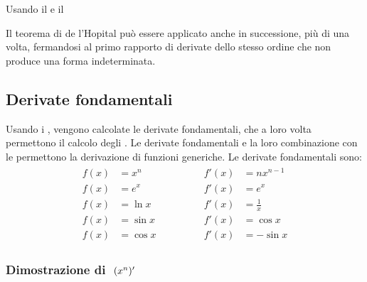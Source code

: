 \documentclass[letterpaper,10pt,italian]{jupyterBook}
\begin{document}
\sphinxAtStartPar
{} Usando il {\hyperref[\detokenize{ch/infinitesimal_calculus/derivatives:infinitesimal-calculus-derivatives-thm-cauchy}]{}} e il {\hyperref[\detokenize{ch/infinitesimal_calculus/derivatives:infinitesimal-calculus-derivatives-thm-lagrange}]{}} 

\sphinxAtStartPar
{} Il teorema di de l’Hopital può essere applicato anche in successione, più di una volta, fermandosi al primo rapporto di derivate dello stesso ordine che non produce una forma indeterminata.


\subsection{Derivate fondamentali}
\label{\detokenize{ch/infinitesimal_calculus/derivatives:derivate-fondamentali}}\label{\detokenize{ch/infinitesimal_calculus/derivatives:infinitesimal-calculus-derivatives-fund}}
\sphinxAtStartPar
Usando i {\hyperref[\detokenize{ch/infinitesimal_calculus/analysis:infinitesimal-calculus-limits-fund}]{}}, vengono calcolate le derivate fondamentali, che a loro volta permettono il calcolo degli {\hyperref[\detokenize{ch/infinitesimal_calculus/integrals:infinitesimal-calculus-integrals-fund}]{}}. Le derivate fondamentali e la loro combinazione con le {\hyperref[\detokenize{ch/infinitesimal_calculus/derivatives:infinitesimal-calculus-derivatives-rules}]{}} permettono la derivazione di funzioni generiche. Le derivate fondamentali sono:
\begin{equation}\label{equation:ch/infinitesimal_calculus/derivatives:eq:infinitesimal-calculus:derivatives:fund}
\begin{split}\begin{aligned}
f(x) & = x^n    \qquad & \qquad f'(x) & = n x^{n-1}   \\ 
f(x) & = e^x    \qquad & \qquad f'(x) & = e^x         \\ 
f(x) & = \ln x  \qquad & \qquad f'(x) & = \frac{1}{x} \\ 
f(x) & = \sin x \qquad & \qquad f'(x) & = \cos x      \\ 
f(x) & = \cos x \qquad & \qquad f'(x) & =-\sin x         
\end{aligned}\end{split}
\end{equation}\subsubsection*{Dimostrazione di \protect\(\ (x^n)'\protect\)}
\end{document}
